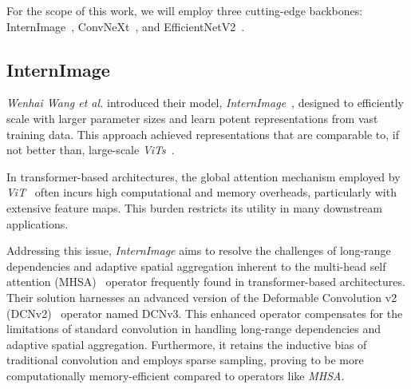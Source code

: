 For the scope of this work, we will employ three cutting-edge backbones: InternImage~\cite{wang2023internimage}, ConvNeXt~\cite{liu2022convnet}, and EfficientNetV2~\cite{tan2021efficientnetv2}.

\subsection{InternImage}
\textit{Wenhai Wang et al.} introduced their model, \textit{InternImage}~\cite{wang2023internimage}, designed to efficiently scale with larger parameter sizes and learn potent representations from vast training data. This approach achieved representations that are comparable to, if not better than, large-scale \textit{ViTs}~\cite{dosovitskiy2021image, liu2021swin, Wang_2022, zhai2022scaling}.

In transformer-based architectures, the global attention mechanism employed by \textit{ViT}~\cite{dosovitskiy2021image} often incurs high computational and memory overheads, particularly with extensive feature maps. This burden restricts its utility in many downstream applications.

Addressing this issue, \textit{InternImage} aims to resolve the challenges of long-range dependencies and adaptive spatial aggregation inherent to the multi-head self attention (MHSA)~\cite{vaswani2023attention} operator frequently found in transformer-based architectures. Their solution harnesses an advanced version of the Deformable Convolution v2 (DCNv2)~\cite{zhu2018deformable} operator named DCNv3. This enhanced operator compensates for the limitations of standard convolution in handling long-range dependencies and adaptive spatial aggregation. Furthermore, it retains the inductive bias of traditional convolution and employs sparse sampling, proving to be more computationally memory-efficient compared to operators like \textit{MHSA}.\\

